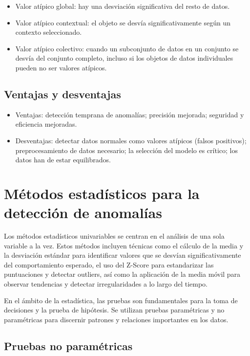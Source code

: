 \begin{itemize}
    \item Valor atípico global: hay una desviación significativa del resto de datos.

    \item  Valor atípico contextual: el objeto se desvía significativamente según un contexto seleccionado. 

    \item Valor atípico colectivo: cuando un subconjunto de datos en un conjunto se desvía del conjunto completo, incluso si los objetos de datos individuales pueden no ser valores atípicos.
\end{itemize}

\subsection{Ventajas y desventajas}
\begin{itemize}
    \item Ventajas: detección temprana de anomalías; precisión mejorada; seguridad y eficiencia mejoradas.

    \item Desventajas: detectar datos normales como valores atípicos (falsos positivos); preprocesamiento de datos necesario; la selección del modelo es crítico; los datos han de estar equilibrados.
\end{itemize}


\section{Métodos estadísticos para la detección de anomalías}

Los métodos estadísticos univariables se centran en el análisis de una sola variable a la vez. Estos métodos incluyen técnicas como el cálculo de la media y la desviación estándar para identificar valores que se desvían significativamente del comportamiento esperado, el uso del Z-Score para estandarizar las puntuaciones y detectar outliers, así como la aplicación de la media móvil para observar tendencias y detectar irregularidades a lo largo del tiempo.

En el ámbito de la estadística, las pruebas son fundamentales para la toma de decisiones y la prueba de hipótesis. Se utilizan pruebas paramétricas y no paramétricas para discernir patrones y relaciones importantes en los datos.

\subsection{Pruebas no paramétricas}

